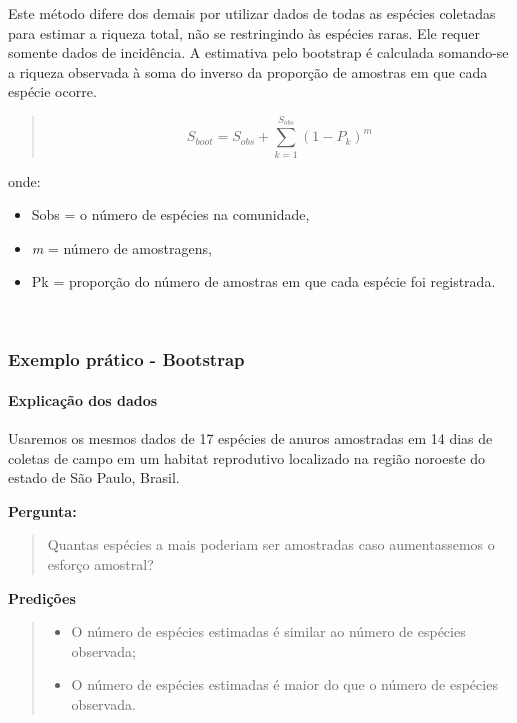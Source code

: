 \documentclass[
]{book}
\providecommand{\tightlist}{%
  \setlength{\itemsep}{0pt}\setlength{\parskip}{0pt}}
\begin{document}
Este método difere dos demais por utilizar dados de todas as espécies coletadas para estimar a riqueza total, não se restringindo às espécies raras. Ele requer somente dados de incidência. A estimativa pelo bootstrap é calculada somando-se a riqueza observada à soma do inverso da proporção de amostras em que cada espécie ocorre.

\begin{quote}
\[S_{boot} = S_{obs} + \sum_{k=1}^{S_{obs}}(1-P_k)^m\]
\end{quote}

onde:

\begin{itemize}
\item
  Sobs = o número de espécies na comunidade,
\item
  \emph{m} = número de amostragens,
\item
  Pk = proporção do número de amostras em que cada espécie foi registrada.
\end{itemize}

~

\hypertarget{exemplo-pruxe1tico---bootstrap}{%
\subsubsection{Exemplo prático - Bootstrap}\label{exemplo-pruxe1tico---bootstrap}}

\hypertarget{explicauxe7uxe3o-dos-dados-5}{%
\paragraph{Explicação dos dados}\label{explicauxe7uxe3o-dos-dados-5}}

Usaremos os mesmos dados de 17 espécies de anuros amostradas em 14 dias de coletas de campo em um habitat reprodutivo localizado na região noroeste do estado de São Paulo, Brasil.

\textbf{Pergunta:}

\begin{quote}
Quantas espécies a mais poderiam ser amostradas caso aumentassemos o esforço amostral?
\end{quote}

\textbf{Predições}

\begin{quote}
\begin{itemize}
\tightlist
\item
  O número de espécies estimadas é similar ao número de espécies observada;
\item
  O número de espécies estimadas é maior do que o número de espécies observada.
\end{itemize}
\end{quote}
\end{document}
